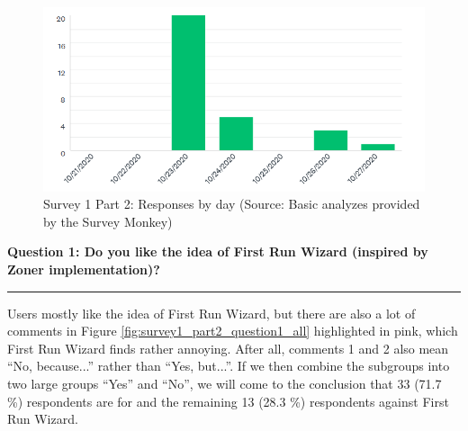 \documentclass[a4paper,10pt,twoside]{article}
\begin{document}
\vspace{0.3cm}
\begin{figure}[hbt!] 
\begin{center}
\includegraphics[width=15cm]{../surveys/analyzed_data/survey1_part2_insight2.png} 
\caption[Survey 1 Part 2: Responses by day]{Survey 1 Part 2: Responses by day (Source: Basic analyzes provided by the Survey Monkey)}
\label{fig:survey1_part2_insight2}
\end{center}
\end{figure}

\newpage
\noindent \textbf{Question 1: Do you like the idea of First Run Wizard (inspired by Zoner implementation)?}
\par\noindent\rule{\textwidth}{0.4pt}
\noindent Users mostly like the idea of First Run Wizard, but there are also a lot of comments in Figure \ref{fig:survey1_part2_question1_all} highlighted in pink, which First Run Wizard finds rather annoying. After all, comments 1 and 2 also mean ``No, because...'' rather than ``Yes, but...''. If we then combine the subgroups into two large groups ``Yes'' and ``No'', we will come to the conclusion that 33 (71.7 \%) respondents are for and the remaining 13 (28.3 \%) respondents against First Run Wizard.
\end{document}
